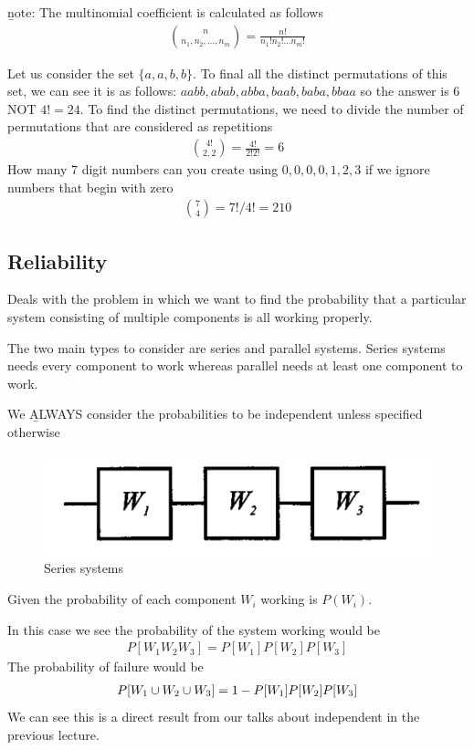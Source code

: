 \documentclass[12pt, titlepage, oneside]{article}
\begin{document}
\b{note}: The multinomial coefficient is calculated as follows
\begin{align}
{n \choose n_1, n_2, \dots, n_m} = \frac{n!}{n_1! n_2! \dots n_m!}
\end{align}

\ex Let us consider the set $\{a,a,b,b\}$. To final all the distinct permutations of this set, we can see it is as follows:
${aabb,abab,abba,baab,baba,bbaa}$ so the answer is $6$ NOT $4!=24$. To find the distinct permutations, we need to divide the number of permutations that are considered as repetitions
\begin{align}
{4! \choose 2,2} = \frac{4!}{2!2!} = 6
\end{align}
\ex How many 7 digit numbers can you create using $0,0,0,0,1,2,3$ if we ignore numbers that begin with zero
\begin{align}
{7 \choose 4} = 7!/4! = 210 
\end{align}

\subsection{Reliability}
Deals with the problem in which we want to find the probability that a particular system consisting of multiple components is all working properly.

The two main types to consider are series and parallel systems. Series systems needs every component to work whereas parallel needs at least one component to work.

We \b{ALWAYS} consider the probabilities to be independent unless specified otherwise

\ex
\begin{figure}[h]
	\centering
	\includegraphics[width=0.7\linewidth]{../Lecture4/images/series}
	\caption{Series systems}
	\label{fig:series}
\end{figure}

Given the probability of each component $W_i$ working is $P(W_i)$. 

In this case we see the probability of the system working would be 
\begin{align}
P[W_1W_2W_3] = P[W_1]P[W_2]P[W_3]
\end{align}
The probability of failure would be
\begin{align}
P[W_1 \cup W_2 \cup W_3] = 1-P[W_1]P[W_2]P[W_3]
\end{align}
We can see this is a direct result from our talks about independent in the previous lecture.
\end{document}
